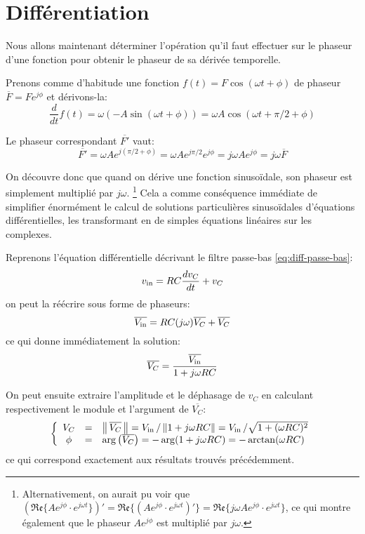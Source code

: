 \section{Différentiation}

Nous allons maintenant déterminer l'opération qu'il faut effectuer
sur le phaseur d'une fonction pour obtenir le phaseur de sa dérivée temporelle.

Prenons comme d'habitude une fonction $f(t) = F\cos(\omega t + \phi)$
de phaseur $\overline{F} = Fe^{j\phi}$
et dérivons-la:
\begin{equation}
    \frac{d}{dt}f(t) = \omega (-A\sin(\omega t + \phi))
    = \omega A \cos(\omega t + \pi/2 + \phi)
\end{equation}

Le phaseur correspondant $\overline{F'}$ vaut:
\begin{equation}
    \overline{F'} = \omega A e^{j(\pi/2 + \phi)} = \omega A e^{j\pi/2} e^{j\phi}
    = j\omega A e^{j\phi} = j\omega \overline{F}
\end{equation}

On découvre donc que quand on dérive une fonction sinusoïdale,
son phaseur est simplement multiplié par $j\omega$.
\footnote{
    Alternativement, on aurait pu voir que
    $(\mathfrak{Re}\{ Ae^{j\phi} \cdot e^{j\omega t}  \})'
    = \mathfrak{Re}\{(Ae^{j\phi} \cdot e^{j\omega t})'\}
    = \mathfrak{Re}\{j\omega A e^{j\phi} \cdot e^{j\omega t}\}$,
    ce qui montre également que le phaseur $Ae^{j\phi}$
    est multiplié par $j\omega$.
}
Cela a comme conséquence immédiate de simplifier énormément
le calcul de solutions particulières sinusoïdales d'équations différentielles,
les transformant en de simples équations linéaires sur les complexes.

Reprenons l'équation différentielle décrivant le filtre passe-bas
\eqref{eq:diff-passe-bas}:
\[
    v_{\mathrm{in}} = RC\frac{dv_C}{dt} + v_C
\]
on peut la réécrire sous forme de phaseurs:
\begin{equation}
    \overline{V_{\mathrm{in}}} = RC(j\omega)\overline{V_C} + \overline{V_C}
\end{equation}
ce qui donne immédiatement la solution:
\begin{equation}
    \overline{V_C} = \frac{\overline{V_{\mathrm{in}}}}{1 + j\omega RC}
\end{equation}

On peut ensuite extraire l'amplitude et le déphasage de $v_C$
en calculant respectivement le module et l'argument de $\overline{V_C}$:
\begin{equation}
    \left\{
        \begin{array}{ccl}
            V_C &=& \left\|\,\overline{V_C}\,\right\|
            = V_{\mathrm{in}}\,/\,\|1+j\omega RC\|
            = V_{\mathrm{in}}\,/\sqrt{1 + (\omega RC)^2} \\
            \phi &=& \arg\left(\overline{V_C}\right) = -\arg(1+j\omega RC)
            = - \arctan(\omega RC)
        \end{array}
    \right.
\end{equation}
ce qui correspond exactement aux résultats trouvés précédemment.
